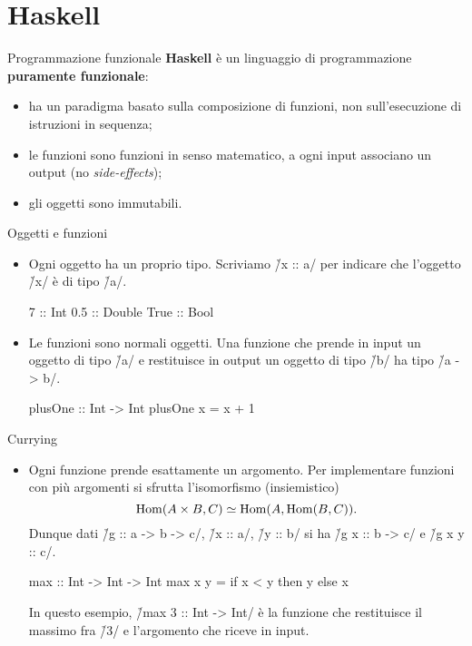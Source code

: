 \section{Haskell}

\begin{frame}[fragile]{\secname}{Programmazione funzionale}
\textbf{Haskell} è un linguaggio di programmazione \textbf{puramente funzionale}:
\begin{itemize}[<+(1)->]
\item ha un paradigma basato sulla composizione di funzioni, non sull'esecuzione di istruzioni in sequenza;
\item le funzioni sono funzioni in senso matematico, a ogni input associano un output (no \emph{side-effects});
\item gli oggetti sono immutabili.
\end{itemize}
\end{frame}

\begin{frame}[fragile]{\secname}{Oggetti e funzioni}
\begin{itemize}
\item Ogni oggetto ha un proprio tipo. Scriviamo \h/x :: a/ per indicare che l'oggetto \h/x/ è di tipo \h/a/.

\pause

\begin{haskellcode}
7 :: Int
0.5 :: Double
True :: Bool
\end{haskellcode}

\item<3-> Le funzioni sono normali oggetti. Una funzione che prende in input un oggetto di tipo \h/a/ e restituisce in output un oggetto di tipo \h/b/ ha tipo \h/a -> b/.

\pause\pause

\begin{haskellcode}
plusOne :: Int -> Int
plusOne x = x + 1
\end{haskellcode}

\end{itemize}
\end{frame}

\begin{frame}[fragile]{\secname}{Currying}
\begin{itemize}
\item Ogni funzione prende esattamente un argomento. Per implementare funzioni con più argomenti si sfrutta l'isomorfismo (insiemistico)
\[
\operatorname{Hom}(A\times B,C)\simeq\operatorname{Hom}(A,\operatorname{Hom}(B,C)).
\]
\pause
Dunque dati \h/g :: a -> b -> c/, \h/x :: a/, \h/y :: b/ si ha \h/g x :: b -> c/ e \h/g x y :: c/.

\pause
\begin{haskellcode}
max :: Int -> Int -> Int
max x y = if x < y then y else x
\end{haskellcode}

\pause
In questo esempio, \h/max 3 :: Int -> Int/ è la funzione che restituisce il massimo fra \h/3/ e l'argomento che riceve in input.
\end{itemize}
\end{frame}

